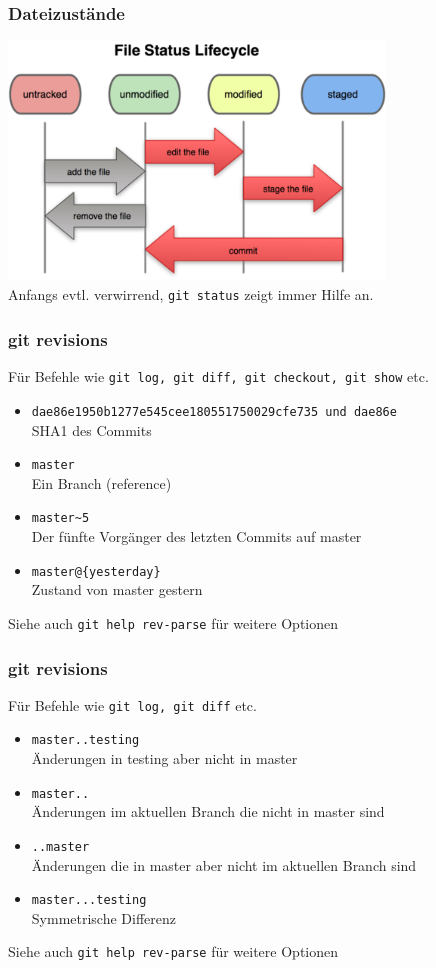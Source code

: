 \begin{frame}
  \frametitle{Dateizustände}
  \vspace{-0.3cm}
  \begin{center}
    \includegraphics[width=10cm]{img/tracked.png} \\
    Anfangs evtl. verwirrend, {\tt git status} zeigt immer Hilfe an.
  \end{center}
\end{frame}

\begin{frame}
  \frametitle{git revisions}
  \small Für Befehle wie {\tt git log, git diff, git checkout, git show} etc.
  \begin{itemize}
    \item {\tt dae86e1950b1277e545cee180551750029cfe735 und dae86e} \\ SHA1 des Commits
    \item {\tt master} \\ Ein Branch (reference)
    \item {\tt master\~{}5} \\ Der fünfte Vorgänger des letzten Commits auf master
    \item {\tt master@\{yesterday\}} \\ Zustand von master gestern
  \end{itemize}
  Siehe auch {\tt git help rev-parse} für weitere Optionen
\end{frame}

\begin{frame}
  \frametitle{git revisions}
  \small Für Befehle wie {\tt git log, git diff} etc.
  \begin{itemize}
    \item {\tt master..testing} \\ Änderungen in testing aber nicht in master
    \item {\tt master..} \\ Änderungen im aktuellen Branch die nicht in master sind
    \item {\tt ..master} \\ Änderungen die in master aber nicht im aktuellen Branch sind
    \item {\tt master...testing} \\ Symmetrische Differenz
  \end{itemize}
  Siehe auch {\tt git help rev-parse} für weitere Optionen
\end{frame}

